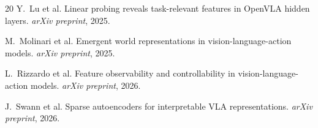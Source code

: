\documentclass[letterpaper]{article}
\begin{document}
{\begin{thebibliography}{20}
Y.~Lu et al.
\newblock Linear probing reveals task-relevant features in OpenVLA hidden layers.
\newblock \emph{arXiv preprint}, 2025.

M.~Molinari et al.
\newblock Emergent world representations in vision-language-action models.
\newblock \emph{arXiv preprint}, 2025.

L.~Rizzardo et al.
\newblock Feature observability and controllability in vision-language-action models.
\newblock \emph{arXiv preprint}, 2026.

J.~Swann et al.
\newblock Sparse autoencoders for interpretable VLA representations.
\newblock \emph{arXiv preprint}, 2026.

\end{thebibliography}
}
\end{document}
